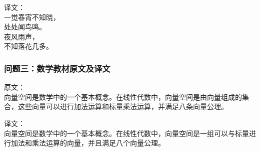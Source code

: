 \documentclass[bwprint]{cumcmthesis}
\begin{document}
\begin{appendices}
\begin{mdframed}
译文：\\
一觉春宵不知晓，\\
处处闻鸟鸣。\\
夜风雨声，\\
不知落花几多。
\end{mdframed}

\subsubsection{问题三：数学教材原文及译文}
\begin{mdframed}
原文：\\
向量空间是数学中的一个基本概念。在线性代数中，向量空间是由向量组成的集合，这些向量可以进行加法运算和标量乘法运算，并满足八条向量公理。

译文：\\
向量空间是数学中的一个基本概念。在线性代数中，向量空间是一组可以与标量进行加法和乘法运算的向量，并且满足八个向量公理。
\end{mdframed}
\end{appendices}
\end{document}
